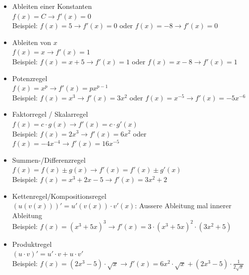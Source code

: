 \documentclass[a4paper]{article}
\begin{document}
\begin{itemize}
	\item Ableiten einer Konstanten\\
	
	$f(x) = C \rightarrow f'(x) = 0$\\
	Beispiel: $f(x) = 5 \rightarrow f'(x) = 0$ oder $f(x) = -8 \rightarrow f'(x) = 0$	
	
	\item Ableiten von $x$\\
	
	$f(x) = x \rightarrow f'(x) = 1$\\
	Beispiel: $f(x) = x + 5 \rightarrow f'(x) = 1$ oder $f(x) = x - 8 \rightarrow f'(x) = 1$
	
	\item Potenzregel\\
	
	$f(x) = x^p \rightarrow f'(x) = px^{p-1}$\\
	Beispiel: $f(x) = x^3 \rightarrow f'(x) = 3x^2$ oder $f(x) = x^{-5} \rightarrow f'(x) = -5x^{-6}$
	
	\item Faktorregel / Skalarregel\\
	
	$f(x) = c \cdot g(x) \rightarrow f'(x) = c \cdot g'(x)$\\
	Beispiel: $f(x) = 2x^3 \rightarrow f'(x) = 6x^2$ oder $f(x) = -4x^{-4} \rightarrow f'(x) = 16x^{-5}$
	
	\item Summen-/Differenzregel\\
	
	$f(x) = f(x) \pm g(x) \rightarrow f'(x) = f'(x) \pm g'(x)$\\
	Beispiel: $f(x) = x^3 + 2x - 5 \rightarrow f'(x) = 3x^2 + 2$
	
	\item Kettenregel/Kompositionsregel\\
	
	$(u(v(x)))' = u'(v(x)) \cdot v'(x)$: Aussere Ableitung mal innerer Ableitung\\
	Beispiel: $f(x) = (x^3 + 5x)^3 \rightarrow f'(x) = 3 \cdot (x^3 + 5x)^2 \cdot (3x^2 + 5)$
	
	\item Produktregel\\
	
	$(u \cdot v)' = u' \cdot v + u \cdot v'$\\
	Beispiel: $f(x) = (2x^3 - 5) \cdot \sqrt{x} \rightarrow f'(x) = 6x^2 \cdot \sqrt{x} + (2x^3 - 5) \cdot \frac{1}{2 \sqrt{x}}$
	

\end{itemize}
\end{document}
